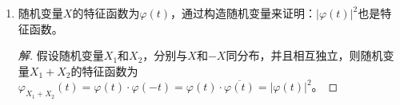 \documentclass[12pt]{article}
\newcommand{\hei}{\CJKfamily{hei}}                          %
\begin{document}
\begin{enumerate}


%	


\item {\hei 随机变量$ X $的特征函数为$ \varphi (t) $，通过构造随机变量来证明：$ {{\left| \varphi \left( t \right) \right|}^{2}} $也是特征函数。}
\begin{proof}[解]
	假设随机变量$ X_{1} $和$ X_{2} $，分别与$ X $和$ -X $同分布，并且相互独立，则随机变量$ X_{1}+X_{2} $的特征函数为$ {{\varphi }_{{{X}_{1}}+{{X}_{2}}}}\left( t \right)=\varphi \left( t \right)\cdot \varphi \left( -t \right)=\varphi \left( t \right)\cdot \overline{\varphi \left( t \right)}={{\left| \varphi \left( t \right) \right|}^{2}} $。
\end{proof}



\end{enumerate}
\end{document}

